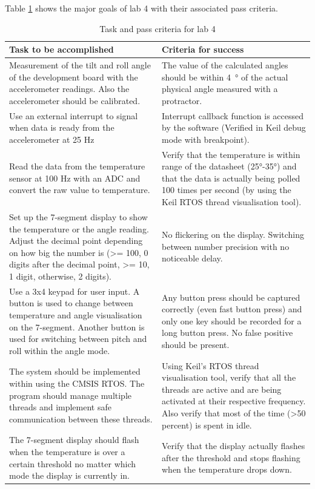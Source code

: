 \documentclass[12pt]{article}
\begin{document}
Table \ref{Table_tasks} shows the major goals of lab 4 with their associated pass criteria.
\begin{table}[!h]
\centering
\caption{Task and pass criteria for lab 4}
\label{Table_tasks}
\begin{tabular}{|p{0.5\linewidth}|p{0.5\linewidth}|}
\hline
\textbf{Task to be accomplished} & \textbf{Criteria for success} \\ \hline
Measurement of the tilt and roll angle of the development board with the accelerometer readings. Also the accelerometer should be calibrated. & The value of the calculated angles should be within \SI{4}{\degree} of the actual physical angle measured with a protractor. \\ \hline
Use an external interrupt to signal when data is ready from the accelerometer at 25 Hz & Interrupt callback function is accessed by the software (Verified in Keil debug mode with breakpoint). \\ \hline
Read the data from the temperature sensor at 100 Hz with an ADC and convert the raw value to temperature. & Verify that the temperature is within range of the datasheet (25°-35°) and that the data is actually being polled 100 times per second (by using the Keil RTOS thread visualisation tool). \\ \hline
Set up the 7-segment display to show the temperature or the angle reading. Adjust the decimal point depending on how big the number is (\textgreater= 100, 0 digits after the decimal point, \textgreater= 10, 1 digit, otherwise, 2 digits). & No flickering on the display. Switching between number precision with no noticeable delay. \\ \hline
Use a 3x4 keypad for user input. A button is used to change between temperature and angle visualisation on the 7-segment. Another button is used for switching between pitch and roll within the angle mode. & Any button press should be captured correctly (even fast button press) and only one key should be recorded for a long button press. No false positive should be present. \\ \hline
The system should be implemented within using the CMSIS RTOS. The program should manage multiple threads and implement safe communication between these threads. & Using Keil's RTOS thread visualisation tool, verify that all the threads are active and are being activated at their respective frequency. Also verify that most of the time (\textgreater 50 percent) is spent in idle. \\ \hline
The 7-segment display should flash when the temperature is over a certain threshold no matter which mode the display is currently in. & Verify that the display actually flashes after the threshold and stops flashing when the temperature drops down. \\ \hline
\end{tabular}
\end{table}
\end{document}
